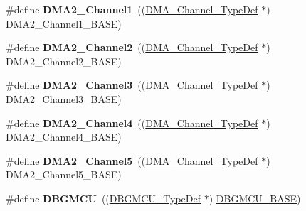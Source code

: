 \begin{DoxyCompactItemize}
\item 
\hypertarget{group___peripheral__declaration_gad86c75e1ff89e03e15570f47962865c8}{\#define {\bfseries D\-M\-A2\-\_\-\-Channel1}~((\hyperlink{struct_d_m_a___channel___type_def}{D\-M\-A\-\_\-\-Channel\-\_\-\-Type\-Def} $\ast$) D\-M\-A2\-\_\-\-Channel1\-\_\-\-B\-A\-S\-E)}\label{group___peripheral__declaration_gad86c75e1ff89e03e15570f47962865c8}

\item 
\hypertarget{group___peripheral__declaration_ga316024020799373b9d8e35c316c74f24}{\#define {\bfseries D\-M\-A2\-\_\-\-Channel2}~((\hyperlink{struct_d_m_a___channel___type_def}{D\-M\-A\-\_\-\-Channel\-\_\-\-Type\-Def} $\ast$) D\-M\-A2\-\_\-\-Channel2\-\_\-\-B\-A\-S\-E)}\label{group___peripheral__declaration_ga316024020799373b9d8e35c316c74f24}

\item 
\hypertarget{group___peripheral__declaration_ga6dca52a79587e0ca9a5d669048b4c7eb}{\#define {\bfseries D\-M\-A2\-\_\-\-Channel3}~((\hyperlink{struct_d_m_a___channel___type_def}{D\-M\-A\-\_\-\-Channel\-\_\-\-Type\-Def} $\ast$) D\-M\-A2\-\_\-\-Channel3\-\_\-\-B\-A\-S\-E)}\label{group___peripheral__declaration_ga6dca52a79587e0ca9a5d669048b4c7eb}

\item 
\hypertarget{group___peripheral__declaration_ga612b396657695191ad740b0b59bc9f12}{\#define {\bfseries D\-M\-A2\-\_\-\-Channel4}~((\hyperlink{struct_d_m_a___channel___type_def}{D\-M\-A\-\_\-\-Channel\-\_\-\-Type\-Def} $\ast$) D\-M\-A2\-\_\-\-Channel4\-\_\-\-B\-A\-S\-E)}\label{group___peripheral__declaration_ga612b396657695191ad740b0b59bc9f12}

\item 
\hypertarget{group___peripheral__declaration_ga521c13b7d0f82a6897d47995da392750}{\#define {\bfseries D\-M\-A2\-\_\-\-Channel5}~((\hyperlink{struct_d_m_a___channel___type_def}{D\-M\-A\-\_\-\-Channel\-\_\-\-Type\-Def} $\ast$) D\-M\-A2\-\_\-\-Channel5\-\_\-\-B\-A\-S\-E)}\label{group___peripheral__declaration_ga521c13b7d0f82a6897d47995da392750}

\item 
\hypertarget{group___peripheral__declaration_ga92ec6d9ec2251fda7d4ce09748cd74b4}{\#define {\bfseries D\-B\-G\-M\-C\-U}~((\hyperlink{struct_d_b_g_m_c_u___type_def}{D\-B\-G\-M\-C\-U\-\_\-\-Type\-Def} $\ast$) \hyperlink{group___peripheral__memory__map_ga4adaf4fd82ccc3a538f1f27a70cdbbef}{D\-B\-G\-M\-C\-U\-\_\-\-B\-A\-S\-E})}\label{group___peripheral__declaration_ga92ec6d9ec2251fda7d4ce09748cd74b4}


\end{DoxyCompactItemize}
